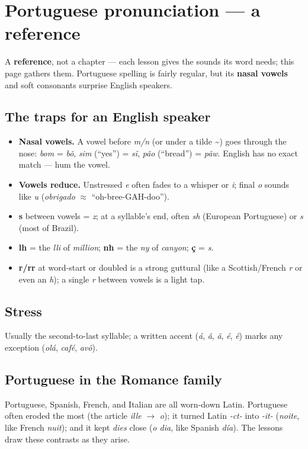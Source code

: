 
\chapter*{Portuguese pronunciation --- a reference}

A \textbf{reference}, not a chapter — each lesson gives the sounds its word needs; this page gathers them. Portuguese spelling is fairly regular, but its \textbf{nasal vowels} and soft consonants surprise English speakers.

\section*{The traps for an English speaker}

\begin{itemize}
\raggedright
\setlength{\itemsep}{0.35em}
  \item \textbf{Nasal vowels.} A vowel before \emph{m/n} (or under a tilde \textasciitilde{}) goes through the nose: \emph{bom} = \emph{bõ}, \emph{sim} (\textquotedblleft{}yes\textquotedblright{}) = \emph{sĩ}, \emph{pão} (\textquotedblleft{}bread\textquotedblright{}) = \emph{pãw}. English has no exact match — hum the vowel.
  \item \textbf{Vowels reduce.} Unstressed \emph{e} often fades to a whisper or \emph{i}; final \emph{o} sounds like \emph{u} (\emph{obrigado} $\approx$ \textquotedblleft{}oh-bree-GAH-doo\textquotedblright{}).
  \item \textbf{s} between vowels = \emph{z}; at a syllable's end, often \emph{sh} (European Portuguese) or \emph{s} (most of Brazil).
  \item \textbf{lh} = the \emph{lli} of \emph{million}; \textbf{nh} = the \emph{ny} of \emph{canyon}; \textbf{ç} = \emph{s}.
  \item \textbf{r/rr} at word-start or doubled is a strong guttural (like a Scottish/French \emph{r} or even an \emph{h}); a single \emph{r} between vowels is a light tap.
\end{itemize}

\section*{Stress}

Usually the second-to-last syllable; a written accent (\emph{á}, \emph{â}, \emph{ã}, \emph{é}, \emph{ê}) marks any exception (\emph{olá}, \emph{café}, \emph{avô}).

\section*{Portuguese in the Romance family}

Portuguese, Spanish, French, and Italian are all worn-down Latin. Portuguese often eroded the most (the article \emph{ille} $\to$ \emph{o}); it turned Latin \emph{-ct-} into \emph{-it-} (\emph{noite}, like French \emph{nuit}); and it kept \emph{dies} close (\emph{o dia}, like Spanish \emph{día}). The lessons draw these contrasts as they arise.
